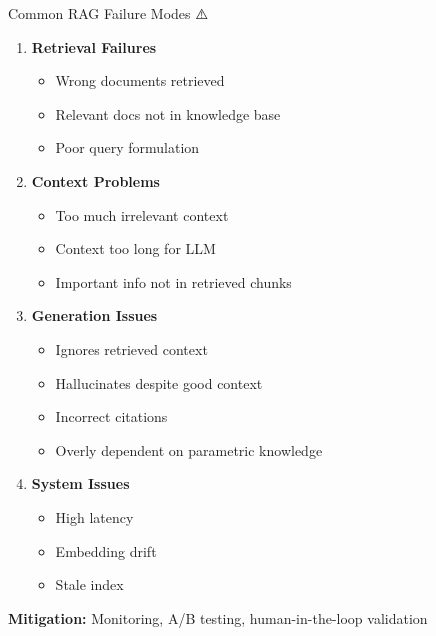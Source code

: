 \documentclass[aspectratio=169]{beamer}
\begin{document}
\begin{frame}[shrink=10]{Common RAG Failure Modes ⚠️}
\begin{enumerate}\setlength{\itemsep}{0pt}
    \item \textbf{Retrieval Failures}
    \begin{itemize}\setlength{\itemsep}{0pt}
        \item Wrong documents retrieved
        \item Relevant docs not in knowledge base
        \item Poor query formulation
    \end{itemize}

    \item \textbf{Context Problems}
    \begin{itemize}\setlength{\itemsep}{0pt}
        \item Too much irrelevant context
        \item Context too long for LLM
        \item Important info not in retrieved chunks
    \end{itemize}

    \item \textbf{Generation Issues}
    \begin{itemize}\setlength{\itemsep}{0pt}
        \item Ignores retrieved context
        \item Hallucinates despite good context
        \item Incorrect citations
        \item Overly dependent on parametric knowledge
    \end{itemize}

    \item \textbf{System Issues}
    \begin{itemize}\setlength{\itemsep}{0pt}
        \item High latency
        \item Embedding drift
        \item Stale index
    \end{itemize}
\end{enumerate}

\vspace{0.3em}

\textbf{Mitigation:} Monitoring, A/B testing, human-in-the-loop validation
\end{frame}

\end{document}

